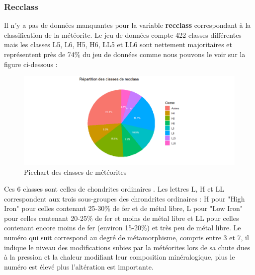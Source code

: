 \documentclass[12pt]{article}
\begin{document}
\subsubsection*{Recclass}
Il n'y a pas de données manquantes pour la variable \textbf{recclass} correspondant à la classification de la météorite. Le jeu de données compte 422 classes différentes mais les classes L5, L6, H5, H6, LL5 et LL6 sont nettement majoritaires et représentent près de 74\% du jeu de données comme nous pouvons le voir sur la figure ci-dessous :
\begin{figure}[H]
\centering
\includegraphics[width=17cm]{Images/exploration/recclass_piechart_class.png}
\caption{Piechart des classes de météorites}
\end{figure}
Ces 6 classes sont celles de chondrites ordinaires \cite{Classification_meteorites}. Les lettres L, H et LL correspondent aux trois sous-groupes des chrondrites ordinaires : H pour "High Iron" pour celles contenant 25-30\% de fer et de métal libre, L pour "Low Iron" pour celles contenant 20-25\% de fer et moins de métal libre et LL pour celles contenant encore moins de fer (environ 15-20\%) et très peu de métal libre. Le numéro qui suit correspond au degré de métamorphisme, compris entre 3 et 7, il indique le niveau des modifications subies par la météorites lors de sa chute dues à la pression et la chaleur modifiant leur composition minéralogique, plus le numéro est élevé plus l'altération est importante.
\end{document}
